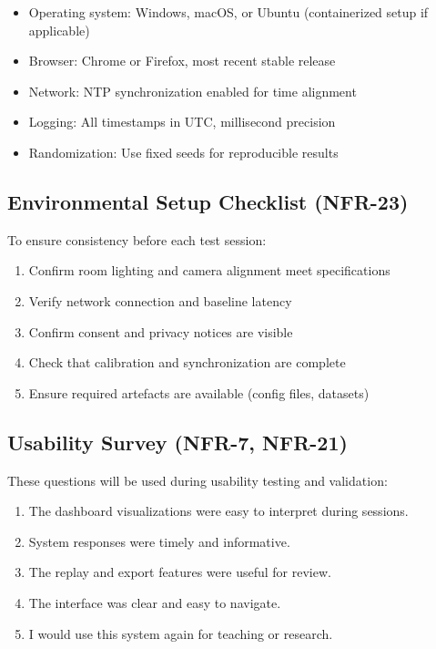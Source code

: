 \documentclass[12pt, titlepage]{article}
\begin{document}
\begin{itemize}
  \item Operating system: Windows, macOS, or Ubuntu (containerized setup if applicable)
  \item Browser: Chrome or Firefox, most recent stable release
  \item Network: NTP synchronization enabled for time alignment
  \item Logging: All timestamps in UTC, millisecond precision
  \item Randomization: Use fixed seeds for reproducible results
\end{itemize}

\subsection{Environmental Setup Checklist (NFR-23)}

To ensure consistency before each test session:

\begin{enumerate}
  \item Confirm room lighting and camera alignment meet specifications
  \item Verify network connection and baseline latency
  \item Confirm consent and privacy notices are visible
  \item Check that calibration and synchronization are complete
  \item Ensure required artefacts are available (config files, datasets)
\end{enumerate}

\subsection{Usability Survey (NFR-7, NFR-21)}

These questions will be used during usability testing and validation:

\begin{enumerate}
  \item The dashboard visualizations were easy to interpret during sessions.
  \item System responses were timely and informative.
  \item The replay and export features were useful for review.
  \item The interface was clear and easy to navigate.
  \item I would use this system again for teaching or research.
\end{enumerate}
\end{document}
